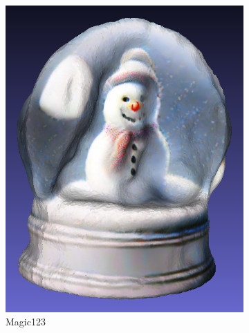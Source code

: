 \begin{figure}[ht]
    \begin{subfigure}[b]{0.234\textwidth}
        \centering
        \includegraphics[width=\textwidth]{figures/subjective/magic123_globe_result.png}
        \caption{Magic123}
        \vspace{0.1cm}
    \end{subfigure}
    \begin{subfigure}[b]{0.27\textwidth}
        \centering

\end{subfigure}
\end{figure}
